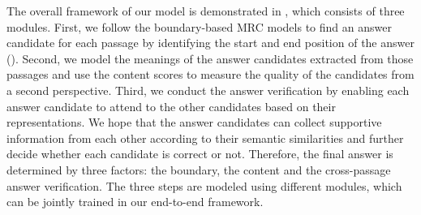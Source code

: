 
The overall framework of our model is demonstrated in  , which consists of three modules. First, we follow the boundary-based MRC models \cite{bidaf,match-lstm} to find an answer candidate for each passage by identifying the start and end position of the answer (). Second, we model the meanings of the answer candidates extracted from those passages and use the content scores to measure the quality of the candidates from a second perspective. Third, we conduct the answer verification by enabling each answer candidate to attend to the other candidates based on their representations. We hope that the answer candidates can collect supportive information from each other according to their semantic similarities and further decide whether each candidate is correct or not. Therefore, the final answer is determined by three factors: the boundary, the content and the cross-passage answer verification. The three steps are modeled using different modules, which can be jointly trained in our end-to-end framework. 





